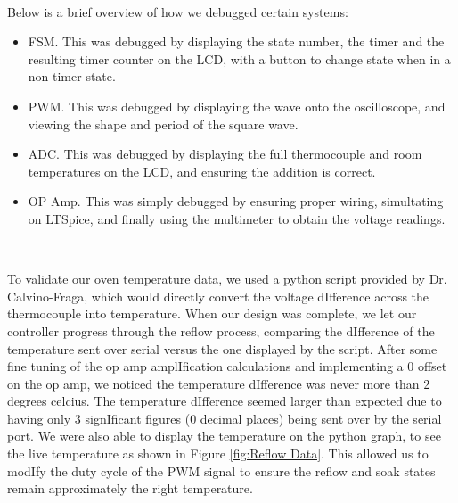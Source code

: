 \documentclass{article}
\begin{document}
\

\noindent Below is a brief overview of how we debugged certain systems:
\begin{itemize}
\item FSM. This was debugged by displaying the state number, the timer and the resulting timer counter on the LCD, with a button to change state when in a non-timer state.
\item PWM. This was debugged by displaying the wave onto the oscilloscope, and viewing the shape and period of the square wave.
\item ADC. This was debugged by displaying the full thermocouple and room temperatures on the LCD, and ensuring the addition is correct.
\item OP Amp. This was simply debugged by ensuring proper wiring, simultating on LTSpice, and finally using the multimeter to obtain the voltage readings.
\end{itemize}

\

\noindent To validate our oven temperature data, we used a python script provided by Dr. Calvino-Fraga, which would directly convert the voltage dIfference across the thermocouple into temperature. When our design was complete, we let our controller progress through the reflow process, comparing the dIfference of the temperature sent over serial versus the one displayed by the script. After some fine tuning of the op amp amplIfication calculations and implementing a 0 offset on the op amp, we noticed the temperature dIfference was never more than 2 degrees celcius. The temperature dIfference seemed larger than expected due to having only 3 signIficant figures (0 decimal places) being sent over by the serial port. We were also able to display the temperature on the python graph, to see the live temperature as shown in Figure \ref{fig:Reflow Data}. This allowed us to modIfy the duty cycle of the PWM signal to ensure the reflow and soak states remain approximately the right temperature.

\
\end{document}
